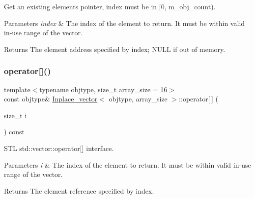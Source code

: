 Get an existing element\textquotesingle{}s pointer, index must be in \mbox{[}0, m\+\_\+obj\+\_\+count). 
\begin{DoxyParams}{Parameters}
{\em index} & The index of the element to return. It must be within valid in-\/use range of the vector. \\
\hline
\end{DoxyParams}
\begin{DoxyReturn}{Returns}
The element address specified by index; N\+U\+LL if out of memory. 
\end{DoxyReturn}
\mbox{\label{classInplace__vector_a00ba1102132980fa0ddbf93a08c7ba03}} 
\subsubsection{\texorpdfstring{operator[]()}{operator[]()}\hspace{0.1cm}{\footnotesize\ttfamily [1/2]}}
{\footnotesize\ttfamily template$<$typename objtype, size\+\_\+t array\+\_\+size = 16$>$ \\
const objtype\& \mbox{\hyperlink{classInplace__vector}{Inplace\+\_\+vector}}$<$ objtype, array\+\_\+size $>$\+::operator\mbox{[}$\,$\mbox{]} (\begin{DoxyParamCaption}\item[{size\+\_\+t}]{i }\end{DoxyParamCaption}) const\hspace{0.3cm}{\ttfamily [inline]}}

S\+TL std\+::vector\+::operator\mbox{[}\mbox{]} interface. 
\begin{DoxyParams}{Parameters}
{\em i} & The index of the element to return. It must be within valid in-\/use range of the vector. \\
\hline
\end{DoxyParams}
\begin{DoxyReturn}{Returns}
The element reference specified by index. 
\end{DoxyReturn}
\mbox{\label{classInplace__vector_a8a67f2bea4e841845b5fbea271ecf03d}} 
